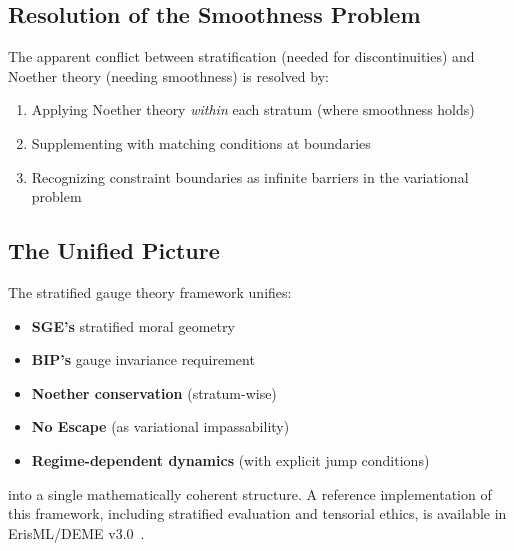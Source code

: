 \documentclass[11pt,a4paper]{article}
\begin{document}
\subsection{Resolution of the Smoothness Problem}

The apparent conflict between stratification (needed for discontinuities) and Noether theory (needing smoothness) is resolved by:
\begin{enumerate}
    \item Applying Noether theory \textit{within} each stratum (where smoothness holds)
    \item Supplementing with matching conditions at boundaries
    \item Recognizing constraint boundaries as infinite barriers in the variational problem
\end{enumerate}

\subsection{The Unified Picture}

The stratified gauge theory framework unifies:
\begin{itemize}
    \item \textbf{SGE's} stratified moral geometry
    \item \textbf{BIP's} gauge invariance requirement
    \item \textbf{Noether conservation} (stratum-wise)
    \item \textbf{No Escape} (as variational impassability)
    \item \textbf{Regime-dependent dynamics} (with explicit jump conditions)
\end{itemize}
into a single mathematically coherent structure. A reference implementation of this framework, including stratified evaluation and tensorial ethics, is available in ErisML/DEME v3.0~\cite{bond2026erisml}.
\end{document}
